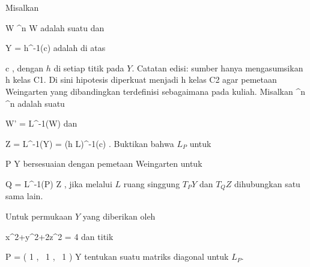 {}
{

Misalkan

\mavergleichskette
{\vergleichskette
{ W
}
{ \subseteq }{ \R^n
}
{  }{
}
{    }{
}
{   }{
}
}
{}{}{}
 { W } { \R
} {}
adalah suatu
dan

\mavergleichskette
{\vergleichskette
{ Y
}
{ = }{ h^{-1}(c)
}
{  }{
}
{    }{
}
{   }{
}
}
{}{}{}
adalah
di atas

\mavergleichskette
{\vergleichskette
{ c
}
{ \in }{ \R
}
{  }{
}
{    }{
}
{   }{
}
}
{}{}{,}
dengan $h$
di setiap titik pada $Y$.
Catatan edisi: sumber hanya mengasumsikan h kelas C1. Di sini hipotesis diperkuat menjadi h kelas C2 agar pemetaan Weingarten yang dibandingkan terdefinisi sebagaimana pada kuliah.
Misalkan
 {\R^n } { \R^n
} {}
adalah suatu

\mavergleichskette
{\vergleichskette
{ W'
}
{ = }{ L^{-1}(W)
}
{  }{
}
{    }{
}
{   }{
}
}
{}{}{}
dan

\mavergleichskettedisp
{\vergleichskette
{ Z
}
{ =} { L^{-1}(Y)
}
{ =} { (h \circ L)^{-1}(c)
}
{ } {
}
{ } {
}
}
{}{}{.}
Buktikan bahwa
$L_P$ untuk

\mavergleichskette
{\vergleichskette
{ P
}
{ \in }{ Y
}
{  }{
}
{    }{
}
{   }{
}
}
{}{}{}
bersesuaian dengan pemetaan Weingarten untuk

\mavergleichskette
{\vergleichskette
{ Q
}
{ = }{ L^{-1}(P)
}
{ \in }{ Z
}
{    }{
}
{   }{
}
}
{}{}{,}
jika melalui $L$ ruang singgung $T_PY$ dan $T_QZ$ dihubungkan satu sama lain.

}
{} {}

{}
{

Untuk permukaan $Y$ yang diberikan oleh

\mavergleichskettedisp
{\vergleichskette
{ x^2+y^2+2z^2
}
{ =} { 4
}
{ } {
}
{ } {
}
{ } {
}
}
{}{}{}
dan titik

\mavergleichskettedisp
{\vergleichskette
{ P
}
{ =} { \left(  1  , \,   1  , \,   1                 \right)
}
{ \in} { Y
}
{ } {
}
{ } {
}
}
{}{}{}
tentukan suatu matriks diagonal untuk
$L_P$.

}
{} {}

